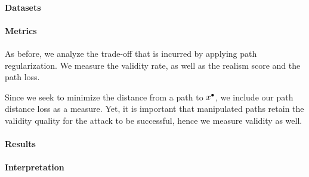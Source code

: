 \documentclass[../main.tex]{subfiles}
\begin{document}
\paragraph{Datasets}

\paragraph{Metrics}

As before, we analyze the trade-off that is incurred by applying path regularization.
We measure the validity rate, as well as the realism score and the path loss.

Since we seek to minimize the distance from a path to $x^\bullet$, we  include our path distance loss as a measure.
Yet, it is important that manipulated paths retain the validity quality for the attack to be successful, hence we measure validity as well.

\paragraph{Results}

\paragraph{Interpretation}
\end{document}
